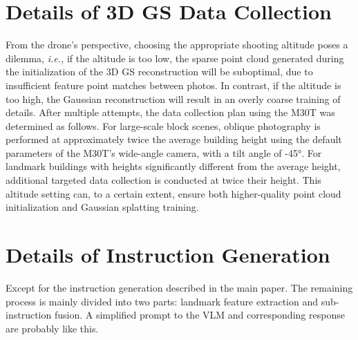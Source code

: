 \section{Details of 3D GS Data Collection}
From the drone's perspective, choosing the appropriate shooting altitude poses a dilemma, \emph{i.e.,} if the altitude is too low, the sparse point cloud generated during the initialization of the 3D GS reconstruction will be suboptimal, due to insufficient feature point matches between photos. In contrast, if the altitude is too high, the Gaussian reconstruction will result in an overly coarse training of details. After multiple attempts, the data collection plan using the M30T was determined as follows. For large-scale block scenes, oblique photography is performed at approximately twice the average building height using the default parameters of the M30T’s wide-angle camera, with a tilt angle of -45°. For landmark buildings with heights significantly different from the average height, additional targeted data collection is conducted at twice their height. This altitude setting can, to a certain extent, ensure both higher-quality point cloud initialization and Gaussian splatting training.


\section{Details of Instruction Generation}

Except for the instruction generation described in the main paper. The remaining process is mainly divided into two parts: landmark feature extraction and sub-instruction fusion. A simplified prompt to the VLM and corresponding response are probably like this.


